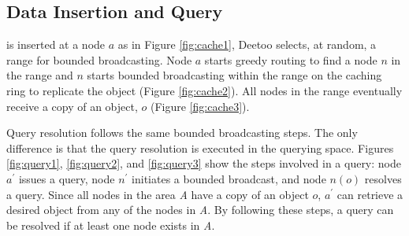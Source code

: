 \documentclass[conference]{IEEEtran}
\begin{document}
\subsection{Data Insertion and Query}\label{sec:cache}
is inserted at a node $a$ as in Figure \ref{fig:cache1}, 
Deetoo selects, at random, a range for bounded broadcasting.
Node $a$ starts greedy routing to find a node 
$n$ in the range and $n$ starts bounded broadcasting 
within the range on the caching ring to replicate the object
(Figure \ref{fig:cache2}). 
All nodes in the range 
eventually receive a copy of an object, $o$ (Figure \ref{fig:cache3}).

Query resolution follows the same bounded broadcasting steps. The only
difference is that the query resolution is executed in the querying
space. 
Figures
\ref{fig:query1}, \ref{fig:query2}, and \ref{fig:query3} show the
steps involved in a query: node $a^\prime$ issues a query, node $n^\prime$ initiates a 
bounded broadcast, and node $n(o)$ resolves a query. Since all nodes in the area
\textit{A} have a copy of an object $o$, $a^\prime$ can retrieve
a desired object from any of the nodes in \textit{A}. By following these
steps, a query can be resolved if at least one node exists in
\textit{A}.

\end{document}

